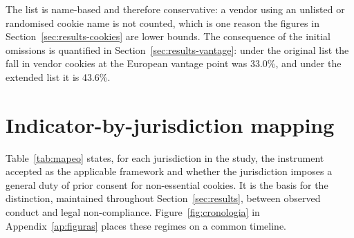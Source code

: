 \documentclass[pdflatex,sn-basic,Numbered]{sn-jnl}
\theoremstyle{thmstyleone}
\theoremstyle{thmstyletwo}
\theoremstyle{thmstylethree}
\begin{document}
\begin{appendices}
The list is name-based and therefore conservative: a vendor using an unlisted or randomised cookie name is not counted, which is one reason the figures in Section~\ref{sec:results-cookies} are lower bounds. The consequence of the initial omissions is quantified in Section~\ref{sec:results-vantage}: under the original list the fall in vendor cookies at the European vantage point was 33.0\%, and under the extended list it is 43.6\%.

\section{Indicator-by-jurisdiction mapping}\label{ap:mapeo}
\setcounter{table}{0}\setcounter{figure}{0}

Table~\ref{tab:mapeo} states, for each jurisdiction in the study, the instrument accepted as the applicable framework and whether the jurisdiction imposes a general duty of prior consent for non-essential cookies. It is the basis for the distinction, maintained throughout Section~\ref{sec:results}, between observed conduct and legal non-compliance. Figure~\ref{fig:cronologia} in Appendix~\ref{ap:figuras} places these regimes on a common timeline.


\end{appendices}
\end{document}
